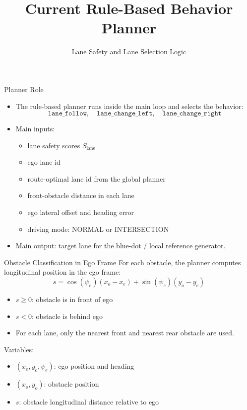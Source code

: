 \documentclass{beamer}
\title{Current Rule-Based Behavior Planner}
\subtitle{Lane Safety and Lane Selection Logic}
\author{}
\date{}
\begin{document}
\begin{frame}
  \titlepage
\end{frame}

\begin{frame}{Planner Role}
  \begin{itemize}
    \item The rule-based planner runs inside the main loop and selects the behavior:
    \[
      \texttt{lane\_follow}, \quad \texttt{lane\_change\_left}, \quad \texttt{lane\_change\_right}
    \]
    \item Main inputs:
    \begin{itemize}
      \item lane safety scores \(S_{\text{lane}}\)
      \item ego lane id
      \item route-optimal lane id from the global planner
      \item front-obstacle distance in each lane
      \item ego lateral offset and heading error
      \item driving mode: NORMAL or INTERSECTION
    \end{itemize}
    \item Main output: target lane for the blue-dot / local reference generator.
  \end{itemize}
\end{frame}

\begin{frame}{Obstacle Classification in Ego Frame}
  For each obstacle, the planner computes longitudinal position in the ego frame:
  \[
    s = \cos(\psi_e)(x_o - x_e) + \sin(\psi_e)(y_o - y_e)
  \]
  \begin{itemize}
    \item \(s \ge 0\): obstacle is in front of ego
    \item \(s < 0\): obstacle is behind ego
    \item For each lane, only the nearest front and nearest rear obstacle are used.
  \end{itemize}

  \vspace{0.5em}
  Variables:
  \begin{itemize}
    \item \((x_e, y_e, \psi_e)\): ego position and heading
    \item \((x_o, y_o)\): obstacle position
    \item \(s\): obstacle longitudinal distance relative to ego
  \end{itemize}
\end{frame}
\end{document}
